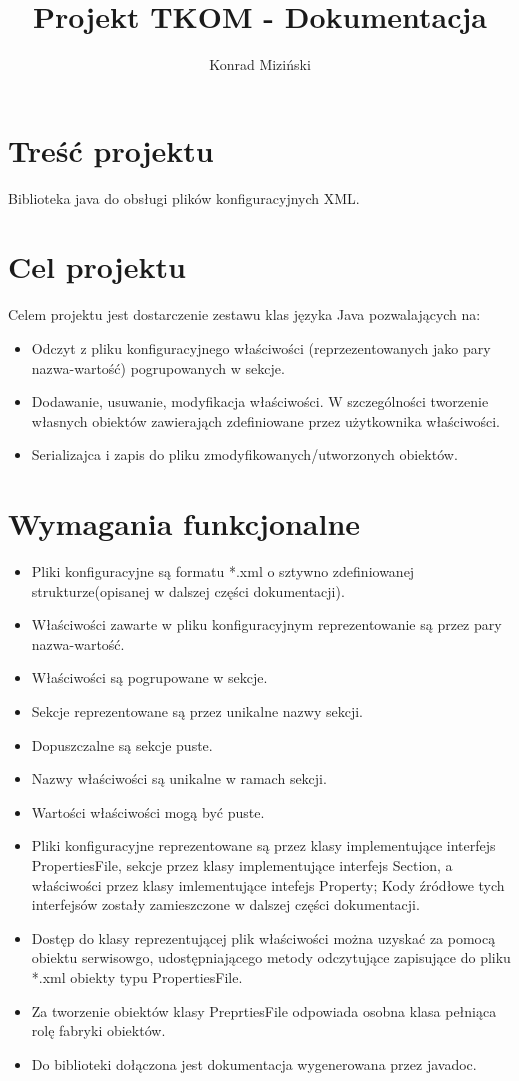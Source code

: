 \documentclass{article}
\author{Konrad Miziński}
\title{Projekt TKOM - Dokumentacja}
\begin{document}
\maketitle


\tableofcontents
\newpage
\section{Treść projektu}
Biblioteka java do obsługi plików konfiguracyjnych XML.

\section{Cel projektu}
Celem projektu jest dostarczenie zestawu klas języka Java pozwalających na:
\begin{itemize}
	\item Odczyt z pliku konfiguracyjnego właściwości (reprzezentowanych jako pary nazwa-wartość)
	pogrupowanych w sekcje.
	\item Dodawanie, usuwanie, modyfikacja właściwości. W szczególności tworzenie własnych obiektów 
	zawierająch zdefiniowane przez użytkownika właściwości.
	\item Serializajca i zapis do pliku zmodyfikowanych/utworzonych obiektów.
\end{itemize}

\section{Wymagania funkcjonalne}
\begin{itemize}
	\item Pliki konfiguracyjne są formatu *.xml o sztywno zdefiniowanej strukturze(opisanej 
	w dalszej części dokumentacji).
	\item Właściwości zawarte w pliku konfiguracyjnym reprezentowanie są przez pary nazwa-wartość.
	\item Właściwości są pogrupowane w sekcje.
	\item Sekcje reprezentowane są przez unikalne nazwy sekcji.
	\item Dopuszczalne są sekcje puste.
	\item Nazwy właściwości są unikalne w ramach sekcji.
	\item Wartości właściwości mogą być puste.
	\item Pliki konfiguracyjne reprezentowane są przez klasy implementujące interfejs PropertiesFile,
	sekcje przez klasy implementujące interfejs Section,
	a właściwości przez klasy imlementujące intefejs Property;
	Kody źródłowe tych interfejsów zostały zamieszczone w dalszej części dokumentacji.
	\item Dostęp do klasy reprezentującej plik właściwości można uzyskać za pomocą obiektu serwisowgo,
	udostępniającego metody odczytujące zapisujące do pliku *.xml obiekty typu PropertiesFile.
	\item Za tworzenie obiektów klasy PreprtiesFile odpowiada osobna klasa pełniąca rolę fabryki obiektów.
	\item Do biblioteki dołączona jest dokumentacja wygenerowana przez javadoc.
\end{itemize}
\end{document}
